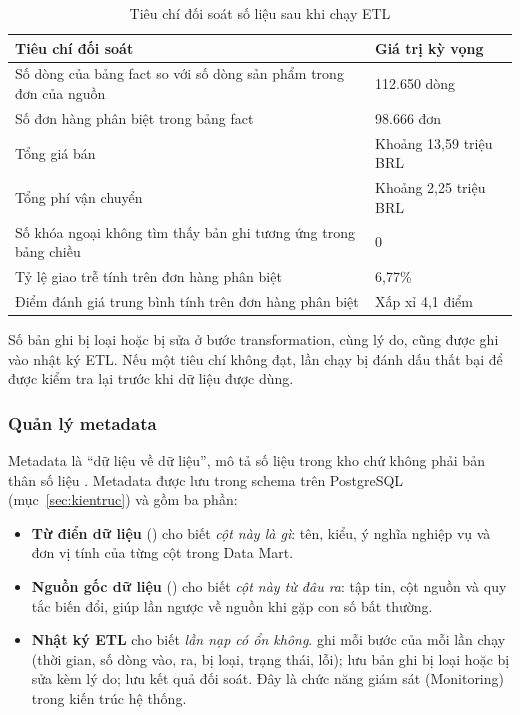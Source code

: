 \begin{table}[H]
\centering
\small{}
\caption{Tiêu chí đối soát số liệu sau khi chạy ETL}
\label{tab:doisoat}
\begin{tabularx}{\linewidth}{|>{\raggedright\arraybackslash}X|P{4.4cm}|}
\hline
\textbf{Tiêu chí đối soát} & \textbf{Giá trị kỳ vọng}\\ \hline
Số dòng của bảng fact so với số dòng sản phẩm trong đơn của nguồn & 112.650 dòng\\ \hline
Số đơn hàng phân biệt trong bảng fact & 98.666 đơn\\ \hline
Tổng giá bán & Khoảng 13,59 triệu BRL\\ \hline
Tổng phí vận chuyển & Khoảng 2,25 triệu BRL\\ \hline
Số khóa ngoại không tìm thấy bản ghi tương ứng trong bảng chiều & 0\\ \hline
Tỷ lệ giao trễ tính trên đơn hàng phân biệt & 6,77\%\\ \hline
Điểm đánh giá trung bình tính trên đơn hàng phân biệt & Xấp xỉ 4,1 điểm\\ \hline
\end{tabularx}
\end{table}

Số bản ghi bị loại hoặc bị sửa ở bước transformation, cùng lý do, cũng được ghi vào nhật ký ETL. Nếu một tiêu chí không đạt, lần chạy bị đánh dấu thất bại để được kiểm tra lại trước khi dữ liệu được dùng.

\subsubsection{Quản lý metadata}

Metadata là ``dữ liệu về dữ liệu'', mô tả số liệu trong kho chứ không phải bản thân số liệu \cite{han}. Metadata được lưu trong schema  trên PostgreSQL (mục~\ref{sec:kientruc}) và gồm ba phần:
\begin{itemize}
    \item \textbf{Từ điển dữ liệu} () cho biết \emph{cột này là gì}: tên, kiểu, ý nghĩa nghiệp vụ và đơn vị tính của từng cột trong Data Mart.
    \item \textbf{Nguồn gốc dữ liệu} () cho biết \emph{cột này từ đâu ra}: tập tin, cột nguồn và quy tắc biến đổi, giúp lần ngược về nguồn khi gặp con số bất thường.
    \item \textbf{Nhật ký ETL} cho biết \emph{lần nạp có ổn không}.  ghi mỗi bước của mỗi lần chạy (thời gian, số dòng vào, ra, bị loại, trạng thái, lỗi);  lưu bản ghi bị loại hoặc bị sửa kèm lý do;  lưu kết quả đối soát. Đây là chức năng giám sát (Monitoring) trong kiến trúc hệ thống.
\end{itemize}
